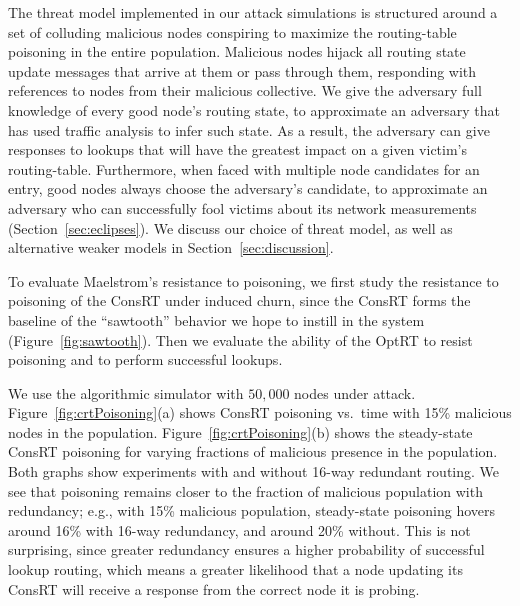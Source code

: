\documentclass[10pt,twocolumn]{article}
\newcommand{\PRT}{OptRT\xspace}
\newcommand{\CRT}{ConsRT\xspace}
\begin{document}
The threat model implemented in our attack simulations is structured
around a set of colluding malicious nodes conspiring to maximize the
routing-table poisoning in the entire population.
Malicious nodes hijack all routing state update messages that arrive at
them or pass through them, responding
with references to nodes from their malicious collective.
We give the adversary full
knowledge of every good node's routing state, to approximate an
adversary that has used traffic analysis to infer such state.  As a
result, the adversary can give responses to lookups
that will have the greatest impact on a given victim's routing-table.  
Furthermore, when faced with multiple node candidates for an entry, good nodes always
choose the adversary's candidate, to approximate an adversary who can
successfully fool victims about its network measurements (Section~\ref{sec:eclipses}).
We discuss
our choice of threat model, as well as alternative weaker models in Section~\ref{sec:discussion}.





To evaluate Maelstrom's resistance to poisoning, we first study the
resistance to poisoning of the \CRT under induced churn, since the \CRT forms the baseline of the
``sawtooth'' behavior we hope to instill in the system
(Figure~\ref{fig:sawtooth}).  Then we evaluate the ability of the \PRT
to resist poisoning and to perform successful lookups.

We use the algorithmic simulator with $50,000$ nodes
under  attack. Figure~\ref{fig:crtPoisoning}(a) shows 
\CRT poisoning vs.\ time with 15\% malicious nodes in the population. 
Figure~\ref{fig:crtPoisoning}(b) shows the steady-state \CRT poisoning
for varying fractions of malicious presence in the population.  Both
graphs show experiments with and without 16-way redundant routing. We see that
poisoning remains closer to the fraction of malicious population with
redundancy; e.g., with 15\% malicious population, steady-state poisoning
hovers around 16\% with 16-way redundancy, and around 20\% without.
This is not surprising, since greater redundancy ensures a higher
probability of successful lookup routing, which means a greater
likelihood that a node updating its \CRT will receive a response from
the correct node it is probing.
\end{document}
